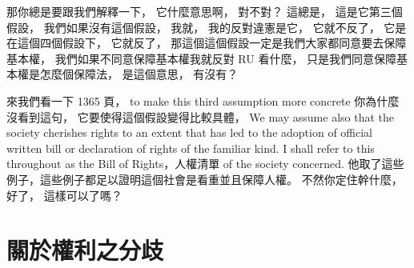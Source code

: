 \hypertarget{w06:cue:1777}{}那你總是要跟我們解釋一下，
\hypertarget{w06:cue:1778}{}它什麼意思啊，
\hypertarget{w06:cue:1779}{}對不對？
\hypertarget{w06:cue:1780}{}這總是，
\hypertarget{w06:cue:1781}{}這是它第三個假設，
\hypertarget{w06:cue:1782}{}我們如果沒有這個假設，
\hypertarget{w06:cue:1783}{}我就，
\hypertarget{w06:cue:1784}{}我的反對違憲是它，
\hypertarget{w06:cue:1785}{}它就不反了，
\hypertarget{w06:cue:1786}{}它是在這個四個假設下，
\hypertarget{w06:cue:1787}{}它就反了，
\hypertarget{w06:cue:1788}{}那這個這個假設一定是我們大家都同意要去保障基本權，
\hypertarget{w06:cue:1789}{}我們如果不同意保障基本權我就反對 RU 看什麼，
\hypertarget{w06:cue:1790}{}只是我們同意保障基本權是怎麼個保障法，
\hypertarget{w06:cue:1791}{}是這個意思，
\hypertarget{w06:cue:1792}{}有沒有？

\hypertarget{w06:cue:1793}{}來我們看一下 1365 頁，
\hypertarget{w06:cue:1794}{}to make this third assumption more concrete
\hypertarget{w06:cue:1795}{}你為什麼沒看到這句，
\hypertarget{w06:cue:1796}{}它要使得這個假設變得比較具體，
\hypertarget{w06:cue:1797}{}We may assume also that the society cherishes rights to an extent that has led to the adoption of official written bill or declaration of rights of the familiar kind.
\hypertarget{w06:cue:1798}{}I shall refer to this throughout as the Bill of Rights，人權清單 of the society concerned.
\hypertarget{w06:cue:1799}{}他取了這些例子，這些例子都足以證明這個社會是看重並且保障人權。
\hypertarget{w06:cue:1800}{}不然你定住幹什麼，
\hypertarget{w06:cue:1801}{}好了，
\hypertarget{w06:cue:1802}{}這樣可以了嗎？

\section{關於權利之分歧}

